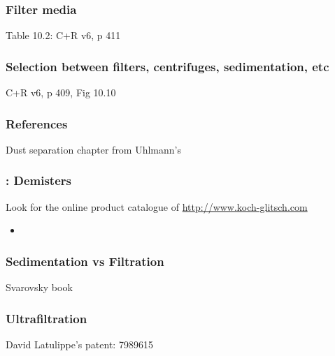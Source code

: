 
\begin{frame}\frametitle{Filter media}
	Table 10.2: C+R v6, p 411
\end{frame}

\begin{frame}\frametitle{Selection between filters, centrifuges, sedimentation, etc}
	C+R v6, p 409, Fig 10.10	
\end{frame}

\begin{frame}\frametitle{References}
	Dust separation chapter from Uhlmann's 
\end{frame}

\begin{frame}\frametitle{{\color{myGreen}{Quick}}: Demisters}
	Look for the online product catalogue of \href{http://www.koch-glitsch.com}{http://www.koch-glitsch.com}
	
	\begin{itemize}
		\item	
	\end{itemize}
\end{frame}

\begin{frame}\frametitle{Sedimentation vs Filtration}
	Svarovsky book
\end{frame}

\begin{frame}\frametitle{Ultrafiltration}
	David Latulippe's patent: 7989615
	
\end{frame}

